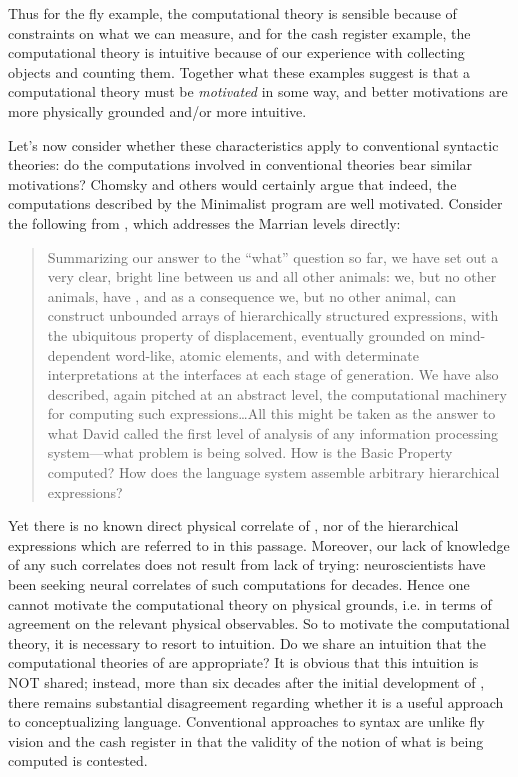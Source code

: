Thus for the fly example, the computational theory is sensible because of constraints on what we can measure, and for the cash register example, the computational theory is intuitive because of our experience with collecting objects and counting them. Together what these examples suggest is that a computational theory must be \textit{motivated} in some way, and better motivations are more physically grounded and/or more intuitive. 

Let's now consider whether these characteristics apply to conventional syntactic theories: do the computations involved in conventional theories bear similar motivations? Chomsky and others would certainly argue that indeed, the computations described by the Minimalist program are well motivated. Consider the following from \citet{BerwickChomsky2016}, which addresses the Marrian levels directly:

\begin{quote} 
Summarizing our answer to the “what” question so far, we have set out a very clear, bright line between us and all other animals: we, but no other animals, have , and as a consequence we, but no other animal, can construct unbounded arrays of hierarchically structured expressions, with the ubiquitous property of displacement, eventually grounded on mind-dependent word-like, atomic elements, and with determinate interpretations at the interfaces at each stage of generation. We have also described, again pitched at an abstract level, the computational machinery for computing such expressions…All this might be taken as the answer to what David \citet{Marr1982} called the first level of analysis of any information processing system—what problem is being solved. How is the Basic Property computed? How does the language system assemble arbitrary hierarchical expressions?
\end{quote}

Yet there is no known direct physical correlate of , nor of the hierarchical expressions which are referred to in this passage. Moreover, our lack of knowledge of any such correlates does not result from lack of trying: neuroscientists have been seeking neural correlates of such computations for decades. Hence one cannot motivate the computational theory on physical grounds, i.e. in terms of agreement on the relevant physical observables. So to motivate the computational theory, it is necessary to resort to intuition. Do we share an intuition that the computational theories of  are appropriate? It is obvious that this intuition is NOT shared; instead, more than six decades after the initial development of , there remains substantial disagreement regarding whether it is a useful approach to conceptualizing language. Conventional approaches to syntax are unlike fly vision and the cash register in that the validity of the notion of what is being computed is contested.

